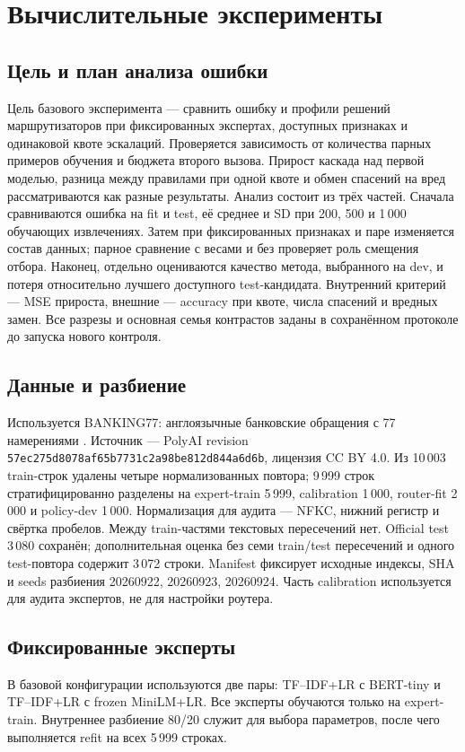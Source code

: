 \section{Вычислительные эксперименты}
\subsection{Цель и план анализа ошибки}
Цель базового эксперимента --- сравнить ошибку и профили решений
маршрутизаторов при фиксированных экспертах, доступных признаках
и одинаковой квоте эскалаций. Проверяется зависимость от количества
парных примеров обучения и бюджета второго вызова. Прирост каскада
над первой моделью, разница между правилами при одной квоте и обмен
спасений на вред рассматриваются как разные результаты.
Анализ состоит из трёх частей. Сначала сравниваются ошибка на fit
и test, её среднее и SD при 200, 500 и 1\,000 обучающих извлечениях.
Затем при фиксированных признаках и паре изменяется состав данных;
парное сравнение с весами и без проверяет роль смещения отбора.
Наконец, отдельно оцениваются качество метода, выбранного на dev,
и потеря относительно лучшего доступного test-кандидата.
Внутренний критерий --- MSE прироста, внешние --- accuracy при квоте,
числа спасений и вредных замен. Все разрезы и основная семья
контрастов заданы в сохранённом протоколе до запуска нового контроля.

\subsection{Данные и разбиение}
Используется BANKING77: англоязычные банковские обращения с 77
намерениями \citep{review17}. Источник --- PolyAI revision
\texttt{57ec275d8078af65b7731c2a98be812d844a6d6b}, лицензия CC BY 4.0.
Из 10\,003 train-строк удалены четыре нормализованных повтора;
9\,999 строк стратифицированно разделены на expert-train 5\,999,
calibration 1\,000, router-fit 2\,000 и policy-dev 1\,000.
Нормализация для аудита --- NFKC, нижний регистр и свёртка пробелов.
Между train-частями текстовых пересечений нет. Official test 3\,080
сохранён; дополнительная оценка без семи train/test пересечений и
одного test-повтора содержит 3\,072 строки. Manifest фиксирует
исходные индексы, SHA и seeds разбиения 20260922, 20260923, 20260924.
Часть calibration используется для аудита экспертов, не для настройки роутера.

\subsection{Фиксированные эксперты}
В базовой конфигурации используются две пары: TF--IDF+LR с BERT-tiny
и TF--IDF+LR с frozen MiniLM+LR. Все эксперты обучаются только
на expert-train. Внутреннее разбиение 80/20 служит для выбора параметров,
после чего выполняется refit на всех 5\,999 строках.

